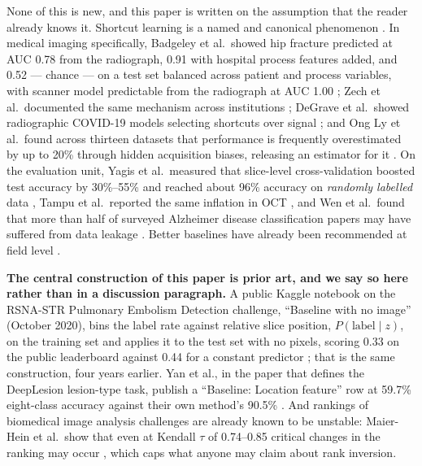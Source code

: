 \documentclass[11pt,a4paper]{article}
\begin{document}
None of this is new, and this paper is written on the assumption that the reader
already knows it. Shortcut learning is a named and canonical phenomenon
\citep{geirhos2020shortcut}. In medical imaging specifically, Badgeley et al.\ showed
hip fracture predicted at AUC 0.78 from the radiograph, 0.91 with hospital
process features added, and 0.52 --- chance --- on a test set balanced across
patient and process variables, with scanner model predictable from the
radiograph at AUC 1.00 \citep{badgeley2019hip}; Zech et al.\ documented the same
mechanism across institutions \citep{zech2018pneumonia}; DeGrave et al.\ showed
radiographic COVID-19 models selecting shortcuts over signal
\citep{degrave2021covid}; and Ong Ly et al.\ found across thirteen datasets that
performance is frequently overestimated by up to 20\% through hidden acquisition
biases, releasing an estimator for it \citep{ongly2024shortcut}. On the evaluation unit,
Yagis et al.\ measured that slice-level cross-validation boosted test accuracy by
30\%--55\% and reached about 96\% accuracy on \emph{randomly labelled} data
\citep{yagis2021leakage}, Tampu et al.\ reported the same inflation in OCT
\citep{tampu2022leakage}, and Wen et al.\ found that more than half of surveyed
Alzheimer disease classification papers may have suffered from data leakage
\citep{wen2020cnn,kapoor2023leakage}. Better baselines have already been recommended at
field level \citep{varoquaux2022failures,roberts2021pitfalls}.

\textbf{The central construction of this paper is prior art, and we say so
here rather than in a discussion paragraph.} A public Kaggle notebook on the
RSNA-STR Pulmonary Embolism Detection challenge, ``Baseline with no image''
(October 2020), bins the label rate against relative slice position,
$P(\text{label}\mid z)$, on the
training set and applies it to the test set with no pixels, scoring 0.33 on the
public leaderboard against 0.44 for a constant predictor
\citep{osciiart2020baseline}; that is the same construction, four years
earlier. Yan et al., in the paper that
defines the DeepLesion lesion-type task, publish a ``Baseline: Location
feature'' row at 59.7\% eight-class accuracy against their own method's 90.5\%
\citep{yan2018deeplesiongraphs}. And rankings of biomedical image analysis challenges are
already known to be unstable: Maier-Hein et al.\ show that even at Kendall
$\tau$ of 0.74--0.85 critical changes in the ranking may occur
\citep{maierhein2018rankings}, which caps what anyone may claim about rank inversion.
\end{document}
